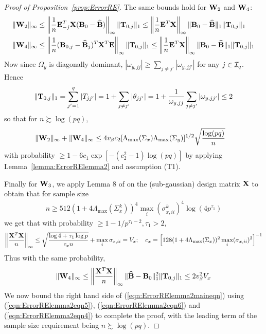 \documentclass[12pt, letterpaper]{article}
\numberwithin{equation}{section}
\begin{document}
\begin{proof}[Proof of Proposition~\ref{prop:ErrorRE}]
The same bounds hold for ${\mathbf{W}}_2$ and ${\mathbf{W}}_4$:
%
\begin{align*}
\| {\mathbf{W}}_2 \|_\infty & \leq \left\| \frac{1}{n} {\mathbf{E}}_{-j}^T {\mathbf{X}} ({\mathbf{B}}_0 - \widehat {{\mathbf{B}}}) \right\|_\infty \| {\mathbf{T}}_{0,j} \|_1 \leq
\left\| \frac{1}{n} {\mathbf{E}}^T {\mathbf{X}} \right\|_\infty \| {\mathbf{B}}_0 - \widehat {{\mathbf{B}}} \|_1 \| {\mathbf{T}}_{0,j} \|_1\\
\| {\mathbf{W}}_4 \|_\infty & \leq \left\| \frac{1}{n} ({\mathbf{B}}_{0,j} - \widehat {{\mathbf{B}}}_j)^T {\mathbf{X}}^T {\mathbf{E}} \right\|_\infty \| {\mathbf{T}}_{0,j} \|_1 \leq
\left\| \frac{1}{n} {\mathbf{E}}^T {\mathbf{X}} \right\|_\infty \| {\mathbf{B}}_0 - \widehat {{\mathbf{B}}} \|_1 \| {\mathbf{T}}_{0,j} \|_1\\
\end{align*}
%
Now since $\Omega_y$ is diagonally dominant, $|\omega_{y,jj}| \geq \sum_{j \neq j'} |\omega_{y,jj'}|$ for any $j \in {\cal{I}}_q$. Hence
%
$$
\| {\mathbf{T}}_{0,j} \|_1 = \sum_{j'=1}^q | T_{jj'} | = 1 + \sum_{j \neq j'} | \theta_{jj'} | = 1 + \frac{1}{\omega_{y,jj}} \sum_{j \neq j'} | \omega_{y,jj'} | \leq 2
$$
%
so that for $n \succsim \log (pq)$,
%
\begin{align}\label{eqn:ErrorRElemma2eqn6}
\| {\mathbf{W}}_2 \|_\infty + \| {\mathbf{W}}_4 \|_\infty  & \leq
4 v_\beta c_2 [ \Lambda_{\max} (\Sigma_x) \Lambda_{\max} (\Sigma_y) ]^{1/2} \sqrt{\frac{ \log(pq)}{n}}
\end{align}
%
with probability $\geq 1 - 6c_1 \exp [-(c_2^2-1) \log(pq)]$ by applying Lemma~\ref{lemma:ErrorRElemma2} and assumption (T1).

Finally for ${\mathbf{W}}_3$, we apply Lemma 8 of \cite{RavikumarEtal11} on the (sub-gaussian) design matrix ${\mathbf{X}}$ to obtain that for sample size
%
\begin{align}\label{eqn:ErrorRElemma2eqn7}
n \geq 512 ( 1 + 4 \Lambda_{\max} (\Sigma_x^k))^4 \max_i (\sigma_{x,ii}^k )^4 \log (4p^{\tau_1})
\end{align}
%
we get that with probability $ \geq 1 - 1/p^{\tau_1-2}, \tau_1 > 2$,
%
$$
\left\| \frac{{\mathbf{X}}^T {\mathbf{X}}}{n} \right\|_\infty \leq \sqrt{ \frac{ \log 4 + \tau_1 \log p}{c_x n}} + \max_i \sigma_{x,ii} = V_x; \quad
c_x = \left[ 128 ( 1 + 4 \Lambda_{\max} (\Sigma_x)  )^2 \max_i (\sigma_{x,ii})^2 \right]^{-1}
$$
%
Thus with the same probability,
%
\begin{align}\label{eqn:ErrorRElemma2eqn4}
\| {\mathbf{W}}_4 \|_\infty \leq \left\| \frac{{\mathbf{X}}^T {\mathbf{X}}}{n} \right\|_\infty \| \widehat {{\mathbf{B}}} - {\mathbf{B}}_0 \|_1^2 \| {\mathbf{T}}_{0,j} \|_1 
\leq 2 v_\beta^2 V_x
\end{align}
%
We now bound the right hand side of (\ref{eqn:ErrorRElemma2maineqn}) using (\ref{eqn:ErrorRElemma2eqn5}), (\ref{eqn:ErrorRElemma2eqn6}) and (\ref{eqn:ErrorRElemma2eqn4}) to complete the proof, with the leading term of the sample size requirement being $n \succsim \log(pq)$.


\end{proof}
\end{document}
